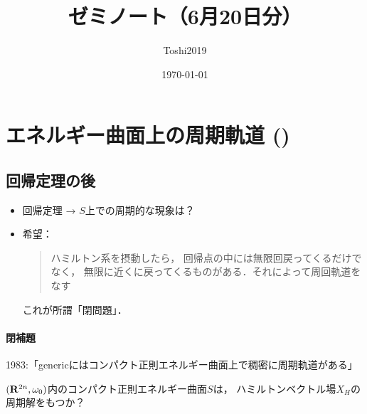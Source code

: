 \newcommand{\cotn}[1][]{\dot{T}^{\ast}{#1}}


\newcommand{\muhom}{\mu hom}
\newcommand{\muHom}[1][]{\mathrm{Hom}^\mu_{\raise1.5ex\hbox to.1em{}#1}}

\newcommand{\mucat}[2][]{\mathsf{D}^{\mathrm{b}}_{#1}(#2)}

\newcommand{\conv}[1][]{\mathbin{\mathop{\circ}\limits_{#1}}}

\newcommand{\torus}{\mathbf{T}}



\title{ゼミノート（6月20日分）}
\author{Toshi2019}
\date{\today}

\maketitle
\tableofcontents

\section{エネルギー曲面上の周期軌道 (\cite[\S1.4]{HZ94})}

\subsection*{回帰定理の後}

\begin{itemize}
    \item 回帰定理 → \(S\)上での周期的な現象は？
    \item 希望：\begin{quote}
        ハミルトン系を摂動したら，
        回帰点の中には無限回戻ってくるだけでなく，
        無限に近くに戻ってくるものがある．それによって周回軌道をなす
    \end{quote}これが所謂「閉問題」．
\end{itemize}

\paragraph{閉補題}1983:「genericにはコンパクト正則エネルギー曲面上で稠密に周期軌道がある」

\begin{Qn*}
    \((\mathbf{R}^{2n},\omega_{0})\)内のコンパクト正則エネルギー曲面\(S\)は，
    ハミルトンベクトル場\(X_H\)の周期解をもつか？
\end{Qn*}

